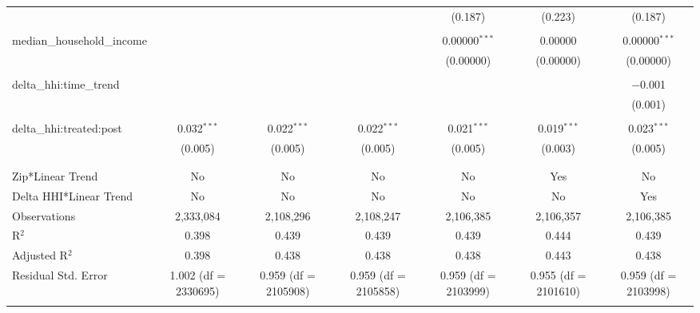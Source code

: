 \begin{table}[H]
{\begin{tabular}{@{\extracolsep{5pt}}lcccccc}
   &  &  &  & (0.187) & (0.223) & (0.187) \\  

   & & & & & & \\  

  median\_household\_income &  &  &  & 0.00000$^{***}$ & 0.00000 & 0.00000$^{***}$ \\  

   &  &  &  & (0.00000) & (0.00000) & (0.00000) \\  

   & & & & & & \\  

  delta\_hhi:time\_trend &  &  &  &  &  & $-$0.001 \\  

   &  &  &  &  &  & (0.001) \\  

   & & & & & & \\  

  delta\_hhi:treated:post & 0.032$^{***}$ & 0.022$^{***}$ & 0.022$^{***}$ & 0.021$^{***}$ & 0.019$^{***}$ & 0.023$^{***}$ \\  

   & (0.005) & (0.005) & (0.005) & (0.005) & (0.003) & (0.005) \\  

   & & & & & & \\  

 \hline \\[-1.8ex]  

 Zip*Linear Trend & No & No & No & No & Yes & No \\  

 Delta HHI*Linear Trend & No & No & No & No & No & Yes \\  

 Observations & 2,333,084 & 2,108,296 & 2,108,247 & 2,106,385 & 2,106,357 & 2,106,385 \\  

 R$^{2}$ & 0.398 & 0.439 & 0.439 & 0.439 & 0.444 & 0.439 \\  

 Adjusted R$^{2}$ & 0.398 & 0.438 & 0.438 & 0.438 & 0.443 & 0.438 \\  

 Residual Std. Error & 1.002 (df = 2330695) & 0.959 (df = 2105908) & 0.959 (df = 2105858) & 0.959 (df = 2103999) & 0.955 (df = 2101610) & 0.959 (df = 2103998) \\  

 \hline  

 \hline \\[-1.8ex]  


\end{tabular}}
\end{table}

